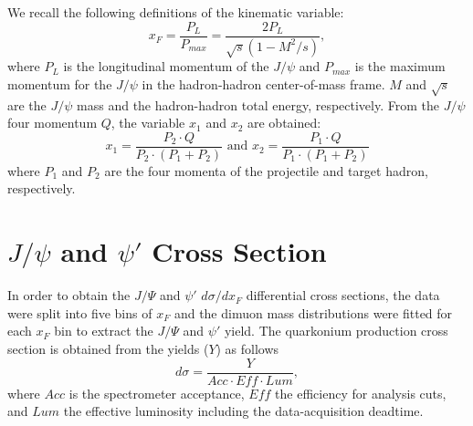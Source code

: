 \documentclass[reprint,aps,unsortedaddress,superscriptaddress,prd,floatfix,showpacs,linenumbers]{revtex4-2}
\begin{document}
We recall the following definitions of the kinematic variable:
\begin{equation}
	x_F = \frac{P_L}{P_{max}}=\frac{2P_L}{\sqrt{s}\left(1-M^2/s\right)},
\end{equation}
where $P_L$ is the longitudinal momentum of the $J/\psi$ and $P_{max}$ is
the maximum momentum for the $J/\psi$ in the hadron-hadron center-of-mass
frame. $M$ and $\sqrt{s}$ are the $J/\psi$ mass and the hadron-hadron total energy,
respectively. From the $J/\psi$ four momentum $Q$, the variable $x_1$ and $x_2$
are obtained:
\begin{equation}
	x_1=\frac{P_2\cdot Q}{P_2 \cdot \left(P_1 + P_2\right)} \textrm{ and } x_2=\frac{P_1\cdot Q}{P_1 \cdot \left(P_1 + P_2\right)}
\end{equation}
where $P_1$ and $P_2$ are the four momenta of the projectile and target hadron,
respectively.

\section{\texorpdfstring{$J/\psi$}{J/psi} and \texorpdfstring{$\psi'$}{psi'} Cross Section}
\label{sec:cross_section}
In order to obtain the $J/\Psi$ and $\psi'$ $d\sigma/dx_F$ differential cross sections,
the data were split into five bins of $x_F$ and the dimuon mass distributions
were fitted for each $x_F$ bin to extract the $J/\Psi$ and $\psi'$ yield.
The quarkonium production cross section is obtained from the yields ($Y$) as follows
\begin{equation}
	d\sigma = \frac{Y}{Acc \cdot Eff \cdot Lum},
	\label{eq:eq2}
\end{equation}
where $Acc$ is the spectrometer acceptance, $Eff$ the efficiency for
analysis cuts, and $Lum$ the effective luminosity including the
data-acquisition deadtime.
\end{document}
